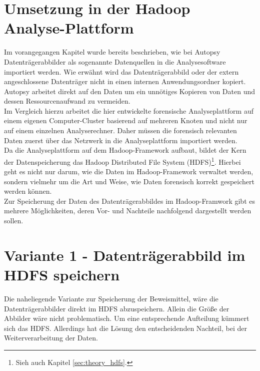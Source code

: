 \section{Umsetzung in der Hadoop Analyse-Plattform}

Im vorangegangen Kapitel wurde bereits beschrieben, wie bei Autopsy Datenträgerabbilder als sogenannte Datenquellen in die Analysesoftware importiert werden. Wie erwähnt wird das Datenträgerabbild oder der extern angeschlossene Datenträger nicht in einen internen Anwendungsordner kopiert. Autopsy arbeitet direkt auf den Daten um ein unnötiges Kopieren von Daten und dessen Ressourcenaufwand zu vermeiden. \\

\noindent
Im Vergleich hierzu arbeitet die hier entwickelte forensische Analyseplattform auf einem eigenen Computer-Cluster basierend auf mehreren Knoten und nicht nur auf einem einzelnen Analyserechner. Daher müssen die forensisch relevanten Daten zuerst über das Netzwerk in die Analyseplattform importiert werden. \\
Da die Analyseplattform auf dem Hadoop-Framework aufbaut, bildet der Kern der Datenspeicherung das Hadoop Distributed File System (HDFS)\footnote{Sieh auch Kapitel \ref{sec:theory_hdfs}.}. Hierbei geht es nicht nur darum, wie die Daten im Hadoop-Framework verwaltet werden, sondern vielmehr um die Art und Weise, wie Daten forensisch korrekt gespeichert werden können.\\


\noindent
Zur Speicherung der Daten des Datenträgerabbildes im Hadoop-Framwork gibt es mehrere Möglichkeiten, deren Vor- und Nachteile nachfolgend dargestellt werden sollen.

\section{Variante 1 - Datenträgerabbild im HDFS speichern}
\label{sec:variant1}

Die naheliegende Variante zur Speicherung der Beweismittel, wäre die Datenträgerabbilder direkt im HDFS abzuspeichern. Allein die Größe der Abbilder wäre nicht problematisch. Um eine entsprechende Aufteilung kümmert sich das HDFS. Allerdings hat die Lösung den entscheidenden Nachteil, bei der Weiterverarbeitung der Daten.\\ 


